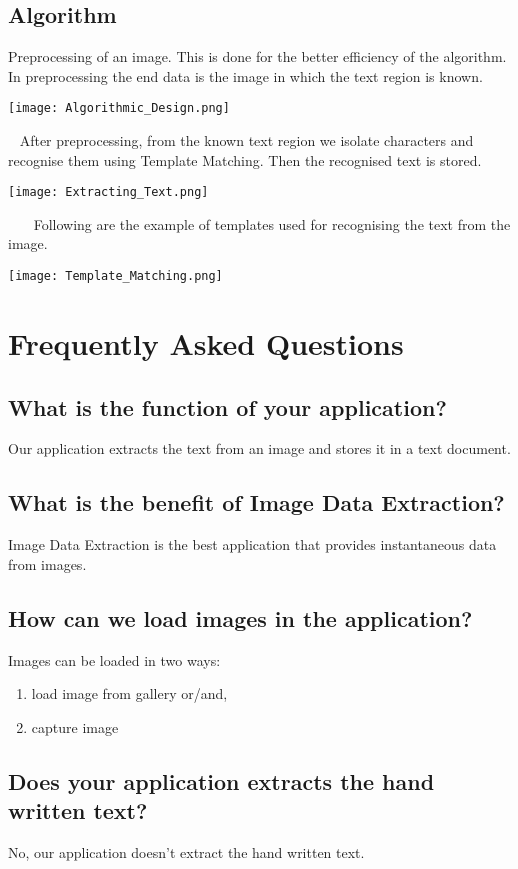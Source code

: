 \documentclass[18 pt]{article}
\begin{document}
\begin{Large}
\begin{flushleft}
\subsection{Algorithm}
Preprocessing of an image. This is done for the better efficiency of the algorithm. In preprocessing the end data is the image in which the text region is known.
\begin{center}
\texttt{[image: Algorithmic\_Design.png]}\\
\end{center}
\
\newpage
After preprocessing, from the known text region we isolate characters and recognise them using Template Matching. Then the recognised text is stored.
\begin{center}
\texttt{[image: Extracting\_Text.png]}\\
\end{center}
\
\
\
\newpage
Following are the example of templates used for recognising the text from the image.
\begin{center}
\texttt{[image: Template\_Matching.png]}\\
\end{center}


\section{Frequently Asked Questions}
\subsection{What is the function of your application?}
Our application extracts the text from an image and stores it in a text document.
\subsection{What is the benefit of Image Data Extraction?}
Image Data Extraction is the best application that provides instantaneous data from images.
\subsection{How can we load images in the application?}
Images can be loaded in two ways:
\begin{enumerate}
\item load image from gallery or/and,
\item capture image 
\end{enumerate}
\subsection{Does your application extracts the hand written text?}
No, our application doesn't extract the hand written text.

\end{flushleft}
\end{Large}
\end{document}
